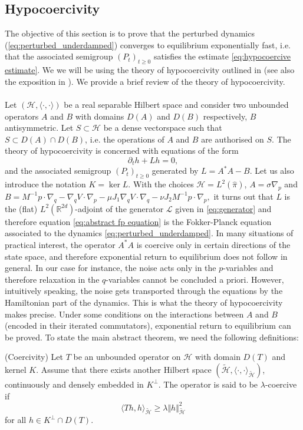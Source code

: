 \subsection{Hypocoercivity}

The objective of this section is to prove that the perturbed dynamics
(\ref{eq:perturbed_underdamped}) converges to equilibrium
exponentially fast, i.e. that the associated semigroup $(P_t)_{t\ge0}$ satisfies the estimate \eqref{eq:hypocoercive estimate}. We we will be using the theory of hypocoercivity outlined in
\cite{villani2009hypocoercivity} (see also the exposition in \cite[Section 6.2]{pavliotis2014stochastic}).
We provide a brief review of the theory of hypocoercivity.
\\\\
Let $(\mathcal{H},\langle\cdot,\cdot\rangle)$ be a real separable
Hilbert space and consider two unbounded operators $A$ and $B$ with
domains $D(A)$ and $D(B)$ respectively, $B$ antisymmetric. Let
$S\subset\mathcal{H}$ be a dense vectorspace such that $S\subset D(A)\cap D(B)$,
i.e. the operations of $A$ and $B$ are authorised on $S$. The theory
of hypocoercivity is concerned with equations of the form 
\begin{equation}
\label{eq:abstract fp equation}
\partial_{t}h+Lh=0,
\end{equation}
and the associated semigroup $(P_t)_{t\ge0}$ generated by $L=A^{*}A-B$. Let
us also introduce the notation $K=\ker L$. With the choices $\mathcal{H}=L^{2}(\widehat{\pi})$,
$A=\sigma\nabla_{p}$ and $B=M^{-1}p\cdot\nabla_{q}-\nabla_{q}V\cdot\nabla_{p}-\mu J_{1}\nabla_{q}V\cdot\nabla_{q}-\nu J_{2}M^{-1}p\cdot\nabla_{p},$
it turns out that $L$ is the (flat) $L^2(\mathbb{R}^{2d})$-adjoint of the generator $\mathcal{L}$ given in \eqref{eq:generator} and therefore equation \eqref{eq:abstract fp equation} is the Fokker-Planck equation associated to the dynamics \eqref{eq:perturbed_underdamped}. 
	In many situations of practical interest, the operator $A^{*}A$ is
	coercive only in certain directions of the state space, and therefore
	exponential return to equilibrium does not follow in general. In our
	case for instance, the noise acts only in the $p$-variables and therefore
	relaxation in the $q$-variables cannot be concluded a priori. However,
	intuitively speaking, the noise gets transported through the equations
	by the Hamiltonian part of the dynamics. This is what the theory of
	hypocoercivity makes precise. Under some conditions on the interactions
	between $A$ and $B$ (encoded in their iterated commutators), exponential
	return to equilibrium can be proved.
To state the main abstract theorem, we need the following definitions: 
\begin{definition}
	(Coercivity) Let $T$ be an unbounded operator on $\mathcal{H}$ with
	domain $D(T)$ and kernel $K$. Assume that there exists another Hilbert
	space $(\tilde{\mathcal{H}},\langle\cdot,\cdot\rangle_{\tilde{\mathcal{H}}})$,
	continuously and densely embedded in $K^{\perp}$. The operator is
	said to be $\lambda$-coercive if 
	\[
	\langle Th,h\rangle_{\tilde{\mathcal{H}}}\ge\lambda\Vert h\Vert_{\tilde{\mathcal{H}}}^{2}
	\]
	for all $h\in K^{\perp}\cap D(T)$. 
\end{definition}

